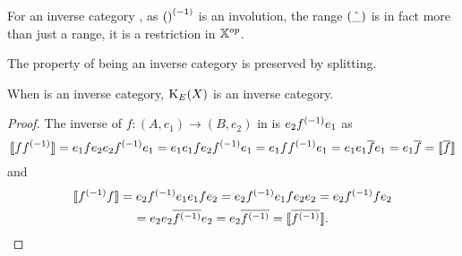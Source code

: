 For an inverse category \X, as ${()}^{(-1)}$ is an involution, the range $(\hat{\_})$ is in fact more
than just a range, it is a restriction in ${\mathbb{X}}^{op}$.

The property of being an inverse category is preserved by splitting.

\begin{lemma}\label{lem:the_idempotent_splitting_of_an_inverse_category_is_an_inverse_category}
  When \X is an inverse category, $\text{K}_{E}(X)$ is an inverse category.
\end{lemma}
\begin{proof}
  The inverse of $f:(A,e_1)\to(B,e_2)$   in  is $e_2{f}^{(-1)}e_1$ as
  \[
    \llbracket f {f}^{(-1)} \rrbracket = e_1 f e_2 e_2 {f}^{(-1)} e_1
    = e_1 e_1 f e_2 {f}^{(-1)} e_1
    = e_1 f  {f}^{(-1)} e_1
    = e_1 e_1 \overline{f} e_1
    = e_1 \overline{f}
    = \llbracket\overline{f}\rrbracket
  \]
  and
  \begin{multline*}
    \llbracket {f}^{(-1)} f\rrbracket=
    e_2 {f}^{(-1)} e_1 e_1 f e_2
    = e_2 {f}^{(-1)} e_1 f e_2 e_2
    = e_2 {f}^{(-1)} f  e_2\\
    = e_2 e_2 \overline{{f}^{(-1)}}  e_2
    = e_2 \overline{{f}^{(-1)}}
    = \llbracket\overline{{f}^{(-1)}}\rrbracket.
  \end{multline*}

\end{proof}

